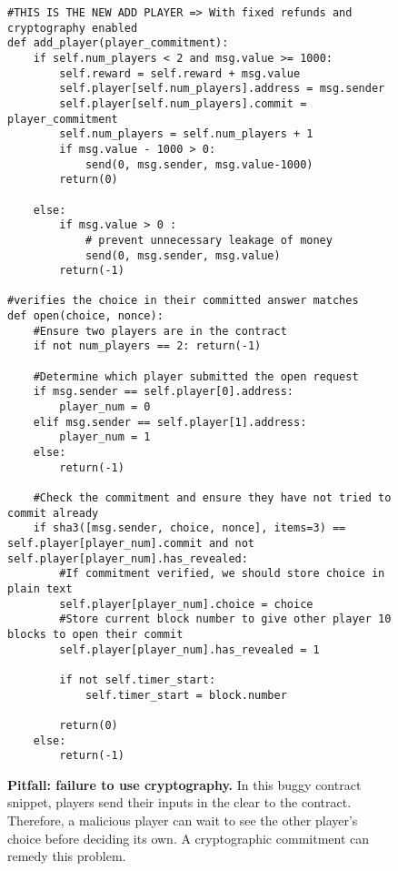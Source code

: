 \documentclass[10pt,twocolumn,letterpaper]{article}
\begin{document}
\begin{figure}
\begin{mdframed}
\begin{verbatim}
#THIS IS THE NEW ADD PLAYER => With fixed refunds and cryptography enabled
def add_player(player_commitment):
	if self.num_players < 2 and msg.value >= 1000:
		self.reward = self.reward + msg.value
		self.player[self.num_players].address = msg.sender
		self.player[self.num_players].commit = player_commitment
		self.num_players = self.num_players + 1
		if msg.value - 1000 > 0:
			send(0, msg.sender, msg.value-1000)
		return(0)

	else:	
		if msg.value > 0 :
			# prevent unnecessary leakage of money
			send(0, msg.sender, msg.value)
		return(-1)
		
#verifies the choice in their committed answer matches
def open(choice, nonce):
	#Ensure two players are in the contract
	if not num_players == 2: return(-1)

	#Determine which player submitted the open request
	if msg.sender == self.player[0].address:
		player_num = 0
	elif msg.sender == self.player[1].address:
		player_num = 1
	else:
		return(-1)

	#Check the commitment and ensure they have not tried to commit already
	if sha3([msg.sender, choice, nonce], items=3) == self.player[player_num].commit and not self.player[player_num].has_revealed:
		#If commitment verified, we should store choice in plain text
		self.player[player_num].choice = choice
		#Store current block number to give other player 10 blocks to open their commit
		self.player[player_num].has_revealed = 1		

		if not self.timer_start:
			self.timer_start = block.number

		return(0)
	else:
		return(-1)
\end{verbatim}
\end{mdframed}
\caption{
\label{fig:nocrypto}
{\bf Pitfall: failure to use cryptography.}
In this buggy contract snippet, players send their inputs 
in the clear to the contract. Therefore, a malicious player 
can wait to see the other player's 
choice before deciding its own.
A cryptographic commitment can remedy this problem.
}
\end{figure}
\end{document}
